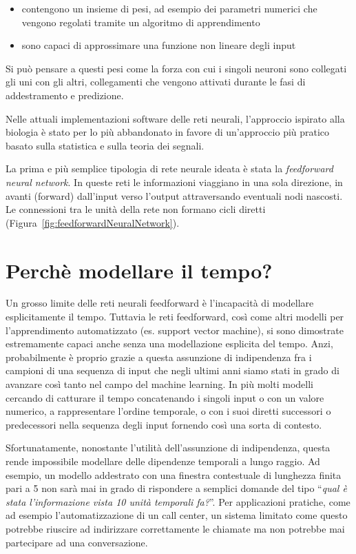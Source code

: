 \begin{itemize}
  \item contengono un insieme di pesi, ad esempio dei parametri numerici che
        vengono regolati tramite un algoritmo di apprendimento
  \item sono capaci di approssimare una funzione non lineare degli input
\end{itemize}

Si pu\`o pensare a questi pesi come la forza con cui i singoli neuroni sono
collegati gli uni con gli altri, collegamenti che vengono attivati durante le
fasi di addestramento e predizione.

Nelle attuali implementazioni software delle reti neurali, l'approccio ispirato
alla biologia \`e stato per lo pi\`u abbandonato in favore di un'approccio pi\`u
pratico basato sulla statistica e sulla teoria dei segnali.

La prima e pi\`u semplice tipologia di rete neurale ideata \`e stata la
\emph{feedforward neural network}. In queste reti le informazioni viaggiano in
una sola direzione, in avanti (forward) dall'input verso l'output attraversando
eventuali nodi nascosti. Le connessioni tra le unit\`a della rete non formano
cicli diretti (Figura~\ref{fig:feedforwardNeuralNetwork}).

\section{Perch\`e modellare il tempo?}

Un grosso limite delle reti neurali feedforward \`e l'incapacit\`a di modellare
esplicitamente il tempo. Tuttavia le reti feedforward, cos\`i come altri modelli
per l'apprendimento automatizzato (es. support vector machine), si sono dimostrate
estremamente capaci anche senza una modellazione esplicita del tempo. Anzi,
probabilmente \`e proprio grazie a questa assunzione di indipendenza fra i campioni
di una sequenza di input che negli ultimi anni siamo stati in grado di avanzare
cos\`i tanto nel campo del machine learning. In pi\`u molti modelli cercando di
catturare il tempo concatenando i singoli input o con un valore numerico, a
rappresentare l'ordine temporale, o con i suoi diretti successori o predecessori
nella sequenza degli input fornendo cos\`i una sorta di contesto.

Sfortunatamente, nonostante l'utilit\`a dell'assunzione di indipendenza, questa
rende impossibile modellare delle dipendenze temporali a lungo raggio. Ad esempio,
un modello addestrato con una finestra contestuale di lunghezza finita pari a 5
non sar\`a mai in grado di rispondere a semplici domande del tipo ``\emph{qual
\`e stata l'informazione vista 10 unit\`a temporali fa?}''. Per applicazioni
pratiche, come ad esempio l'automatizzazione di un call center, un sistema
limitato come questo potrebbe riuscire ad indirizzare correttamente le chiamate
ma non potrebbe mai partecipare ad una conversazione.

